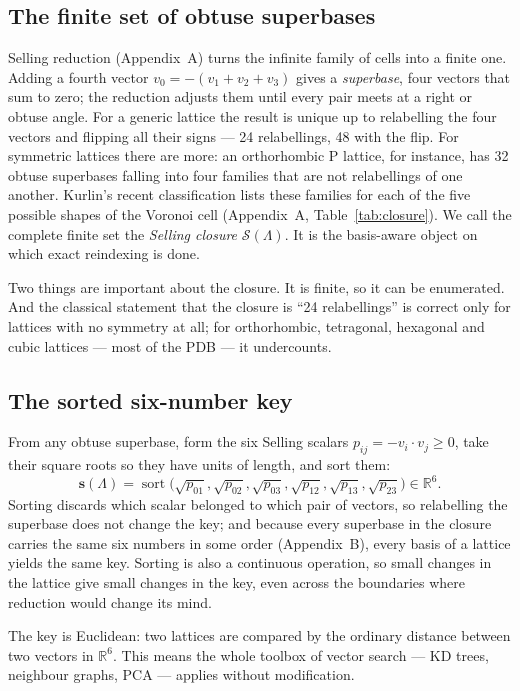 \documentclass[11pt]{article}
\newcommand{\sortkey}{\mathbf{s}}
\newcommand{\Sclosure}{\mathcal{S}}
\begin{document}
\subsection{The finite set of obtuse superbases}

Selling reduction (Appendix~A) turns the infinite family of cells into a finite one. Adding a fourth vector $v_0=-(v_1+v_2+v_3)$ gives a \emph{superbase}, four vectors that sum to zero; the reduction adjusts them until every pair meets at a right or obtuse angle. For a generic lattice the result is unique up to relabelling the four vectors and flipping all their signs --- 24 relabellings, 48 with the flip. For symmetric lattices there are more: an orthorhombic P lattice, for instance, has 32 obtuse superbases falling into four families that are not relabellings of one another. Kurlin's recent classification lists these families for each of the five possible shapes of the Voronoi cell (Appendix~A, Table~\ref{tab:closure}). We call the complete finite set the \emph{Selling closure} $\Sclosure(\Lambda)$. It is the basis-aware object on which exact reindexing is done.

Two things are important about the closure. It is finite, so it can be enumerated. And the classical statement that the closure is ``24 relabellings'' is correct only for lattices with no symmetry at all; for orthorhombic, tetragonal, hexagonal and cubic lattices --- most of the PDB --- it undercounts.

\subsection{The sorted six-number key}

From any obtuse superbase, form the six Selling scalars $p_{ij}=-v_i\cdot v_j\ge0$, take their square roots so they have units of length, and sort them:
\[
\sortkey(\Lambda)=\operatorname{sort}\big(\sqrt{p_{01}},\sqrt{p_{02}},\sqrt{p_{03}},\sqrt{p_{12}},\sqrt{p_{13}},\sqrt{p_{23}}\big)\in\mathbb R^6 .
\]
Sorting discards which scalar belonged to which pair of vectors, so relabelling the superbase does not change the key; and because every superbase in the closure carries the same six numbers in some order (Appendix~B), every basis of a lattice yields the same key. Sorting is also a continuous operation, so small changes in the lattice give small changes in the key, even across the boundaries where reduction would change its mind.

The key is Euclidean: two lattices are compared by the ordinary distance between two vectors in $\mathbb R^6$. This means the whole toolbox of vector search --- KD trees, neighbour graphs, PCA --- applies without modification.
\end{document}
